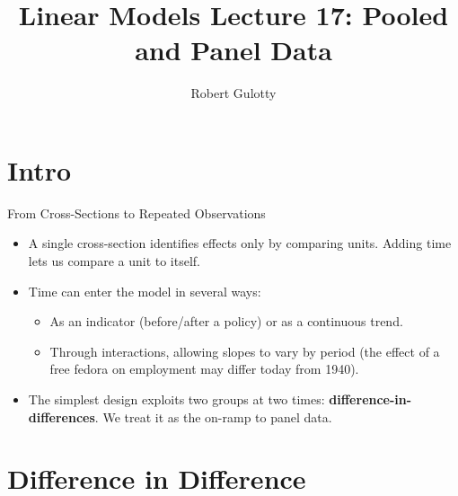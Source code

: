 \documentclass[aspectratio=169, handout]{beamer}
\title[PLSC 30700]{Linear Models Lecture 17: Pooled and Panel Data}
\author{Robert Gulotty}
\institute[Chicago]{University of Chicago}
\numberwithin{equation}{section}
\begin{document}
\begin{frame}
\maketitle
\end{frame}

\section{Intro}
\setcounter{subsection}{1}

\begin{frame}{From Cross-Sections to Repeated Observations}
\begin{itemize}
\item A single cross-section identifies effects only by comparing units. Adding time lets us compare a unit to itself.
\item Time can enter the model in several ways:
\begin{itemize}
\item As an indicator (before/after a policy) or as a continuous trend.
\item Through interactions, allowing slopes to vary by period (the effect of a free fedora on employment may differ today from 1940).
\end{itemize}
\item The simplest design exploits two groups at two times: \textbf{difference-in-differences}. We treat it as the on-ramp to panel data.
\end{itemize}
\end{frame}


\section{Difference in Difference}
\setcounter{subsection}{1}
\end{document}
